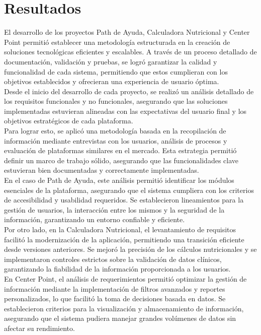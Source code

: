 \documentclass[12pt,letterpaper,spanish, xcolor=table]{report}
\numberwithin{figure}{subsection}
\begin{document}
\section{Resultados}

	El desarrollo de los proyectos Path de Ayuda, Calculadora Nutricional y Center Point permitió establecer una metodología estructurada en la creación de soluciones tecnológicas eficientes y escalables. A través de un proceso detallado de documentación, validación y pruebas, se logró garantizar la calidad y funcionalidad de cada sistema, permitiendo que estos cumplieran con los objetivos establecidos y ofrecieran una experiencia de usuario óptima.\\
	
	Desde el inicio del desarrollo de cada proyecto, se realizó un análisis detallado de los requisitos funcionales y no funcionales, asegurando que las soluciones implementadas estuvieran alineadas con las expectativas del usuario final y los objetivos estratégicos de cada plataforma.\\
	
	Para lograr esto, se aplicó una metodología basada en la recopilación de información mediante entrevistas con los usuarios, análisis de procesos y evaluación de plataformas similares en el mercado. Esta estrategia permitió definir un marco de trabajo sólido, asegurando que las funcionalidades clave estuvieran bien documentadas y correctamente 
	implementadas.\\
	
	En el caso de Path de Ayuda, este análisis permitió identificar los módulos esenciales de la plataforma, asegurando que el sistema cumpliera con los criterios de accesibilidad y usabilidad requeridos. Se establecieron lineamientos para la gestión de usuarios, la 
	interacción entre los mismos y la seguridad de la información, garantizando un entorno confiable y eficiente.\\
	
	Por otro lado, en la Calculadora Nutricional, el levantamiento de requisitos facilitó la modernización de la aplicación, permitiendo una transición eficiente desde versiones anteriores. Se mejoró la precisión de los cálculos nutricionales y se implementaron controles estrictos sobre la validación de datos clínicos, garantizando la fiabilidad de la 
	información proporcionada a los usuarios.\\
	
	En Center Point, el análisis de requerimientos permitió optimizar la gestión de información mediante la implementación de filtros avanzados y reportes personalizados, lo que facilitó la toma de decisiones basada en datos. Se establecieron criterios para la visualización y almacenamiento de información, asegurando que el sistema pudiera manejar grandes volúmenes de datos sin afectar su rendimiento.\\
	
\end{document}
